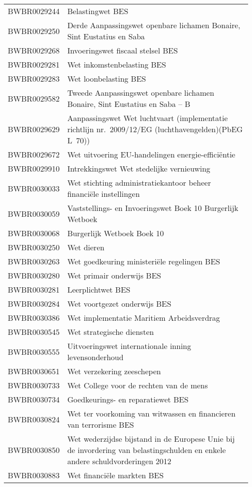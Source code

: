 \begin{longtable}{lp{}}
BWBR0029244 & Belastingwet BES \\
BWBR0029250 & Derde Aanpassingswet openbare lichamen Bonaire, Sint Eustatius en Saba \\
BWBR0029268 & Invoeringswet fiscaal stelsel BES \\
BWBR0029281 & Wet inkomstenbelasting BES \\
BWBR0029283 & Wet loonbelasting BES \\
BWBR0029582 & Tweede Aanpassingswet openbare lichamen Bonaire, Sint Eustatius en Saba – B \\
BWBR0029629 & Aanpassingswet Wet luchtvaart (implementatie richtlijn nr. 2009/12/EG (luchthavengelden)(PbEG L 70)) \\
BWBR0029672 & Wet uitvoering EU-handelingen energie-efficiëntie \\
BWBR0029910 & Intrekkingswet Wet stedelijke vernieuwing \\
BWBR0030033 & Wet stichting administratiekantoor beheer financiële instellingen \\
BWBR0030059 & Vaststellings- en Invoeringswet Boek 10 Burgerlijk Wetboek \\
BWBR0030068 & Burgerlijk Wetboek Boek 10 \\
BWBR0030250 & Wet dieren \\
BWBR0030263 & Wet goedkeuring ministeriële regelingen BES \\
BWBR0030280 & Wet primair onderwijs BES \\
BWBR0030281 & Leerplichtwet BES \\
BWBR0030284 & Wet voortgezet onderwijs BES \\
BWBR0030386 & Wet implementatie Maritiem Arbeidsverdrag \\
BWBR0030545 & Wet strategische diensten  \\
BWBR0030555 & Uitvoeringswet internationale inning levensonderhoud \\
BWBR0030651 & Wet verzekering zeeschepen  \\
BWBR0030733 & Wet College voor de rechten van de mens \\
BWBR0030734 & Goedkeurings- en reparatiewet BES \\
BWBR0030824 & Wet ter voorkoming van witwassen en financieren van terrorisme BES \\
BWBR0030850 & Wet wederzijdse bijstand in de Europese Unie bij de invordering van belastingschulden en enkele andere schuldvorderingen 2012 \\
BWBR0030883 & Wet financiële markten BES  \\

\end{longtable}
